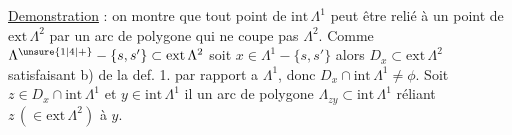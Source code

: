 \uline{Demonstration} : on montre que tout point de $\mathrm{int}\,\Lambda^{1}$ peut être relié à un point de $\mathrm{ext}\,\Lambda^{2}$ par un arc de polygone qui ne coupe pas $\Lambda^{2}$. Comme $\Lambda^{\unsure{1|4|+}}-\{s,s'\}\subset\mathrm{ext}\,\Lambda^{2}$ soit $x\in\Lambda^{1}-\{s,s'\}$ alors  $D_x\subset\mathrm{ext}\,\Lambda^{2}$ satisfaisant b) de la def. 1. par rapport a $\Lambda^{1}$, donc $D_x\cap\mathrm{int}\,\Lambda^{1}\ne\phi$. Soit $z\in D_x\cap\mathrm{int}\,\Lambda^{1}$ et $y\in\mathrm{int}\,\Lambda^{1}$ il  un arc de polygone $\Lambda_{zy}\subset\mathrm{int}\,\Lambda^{1}$ réliant $z\,(\in\mathrm{ext}\,\Lambda^{2})$ à $y$.

